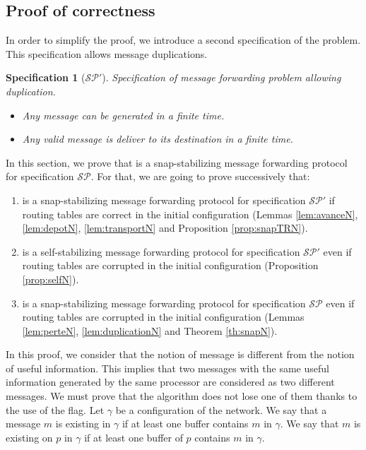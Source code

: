 \documentclass[11pt]{article}
\newtheorem{specification}{Specification}
\begin{document}
\subsection{Proof of correctness}

In order to simplify the proof, we introduce a second specification of the problem. This specification allows message duplications.

\begin{specification} [\textbf{$\mathcal{SP}'$}] \label{specif:spe1}
Specification of message forwarding problem allowing duplication.
\begin{itemize}
\item Any message can be generated in a finite time.
\item Any valid message is deliver to its destination in a finite time.
\end{itemize}
\end{specification}

In this section, we prove that \AN is a snap-stabilizing message forwarding protocol for specification $\mathcal{SP}$.  For that, we are going to prove successively that:
\begin{enumerate}
\item \AN is a snap-stabilizing message forwarding protocol for specification $\mathcal{SP}'$ if routing tables are correct in the initial configuration (Lemmas \ref{lem:avanceN}, \ref{lem:depotN}, \ref{lem:transportN} and Proposition \ref{prop:snapTRN}). 
\item \AN is a self-stabilizing message forwarding protocol for specification $\mathcal{SP}'$ even if routing tables are corrupted in the initial configuration (Proposition \ref{prop:selfN}). 
\item \AN is a snap-stabilizing message forwarding protocol for specification $\mathcal{SP}$ even if routing tables are corrupted in the initial configuration (Lemmas \ref{lem:perteN}, \ref{lem:duplicationN} and Theorem \ref{th:snapN}).
\end{enumerate}

In this proof, we consider that the notion of message is different from the notion of useful information. This implies that two messages with the same useful information generated by the same processor are considered as two different messages. We must prove that the algorithm does not lose one of them thanks to the use of the flag. Let $\gamma$ be a configuration of the network. We say that a message $m$ is existing in $\gamma$ if at least one buffer contains $m$ in $\gamma$. We say that $m$ is existing on $p$ in $\gamma$ if at least one buffer of $p$ contains $m$ in $\gamma$.
\end{document}
